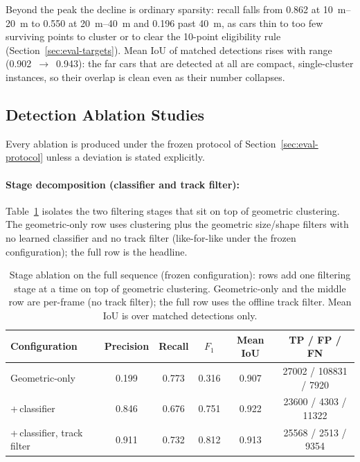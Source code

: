 Beyond the peak the decline is ordinary sparsity: recall falls from \num{0.862}
at \SIrange{10}{20}{\metre} to \num{0.550} at \SIrange{20}{40}{\metre} and
\num{0.196} past \SI{40}{\metre}, as cars thin to too few surviving points to
cluster or to clear the \num{10}-point eligibility rule (Section~\ref{sec:eval-targets}).
Mean IoU of matched detections rises with range
(\num{0.902}~$\rightarrow$~\num{0.943}): the far cars that are detected at all are
compact, single-cluster instances, so their overlap is clean even as their number
collapses.

\subsection{Detection Ablation Studies}
\label{sec:abl-detection}
\label{sec:results-ablations}

Every ablation is produced under the frozen protocol of
Section~\ref{sec:eval-protocol} unless a deviation is stated explicitly.

\paragraph{Stage decomposition (classifier and track filter):}
\label{sec:ablation-stage}

Table~\ref{tab:ablation-stage} isolates the two filtering stages that sit on top
of geometric clustering. The geometric-only row uses clustering plus the
geometric size/shape filters with no learned classifier and no
track filter (like-for-like under the frozen
configuration); the full row is the headline.

\begin{table}[H]
  \centering
  \caption[Stage ablation]{Stage ablation on the full sequence (frozen
    configuration): rows add one filtering stage at a time on top of geometric clustering.
    Geometric-only and the middle row are per-frame (no track filter); the full row uses the
    offline track filter. Mean IoU is over matched detections only.}
  \label{tab:ablation-stage}
  \setlength{\tabcolsep}{5pt}
  \begin{tabular}{lccccc}
    \toprule
    Configuration & Precision & Recall & $F_1$ & Mean IoU & TP / FP / FN \\
    \midrule
    Geometric-only                & 0.199 & 0.773 & 0.316 & 0.907 & \num{27002} / \num{108831} / \num{7920} \\
    \;+\,classifier              & 0.846 & 0.676 & 0.751 & 0.922 & \num{23600} / \num{4303} / \num{11322} \\
    \;+\,classifier, track filter & 0.911 & 0.732 & 0.812 & 0.913 & \num{25568} / \num{2513} / \num{9354} \\
    \bottomrule
  \end{tabular}
\end{table}

